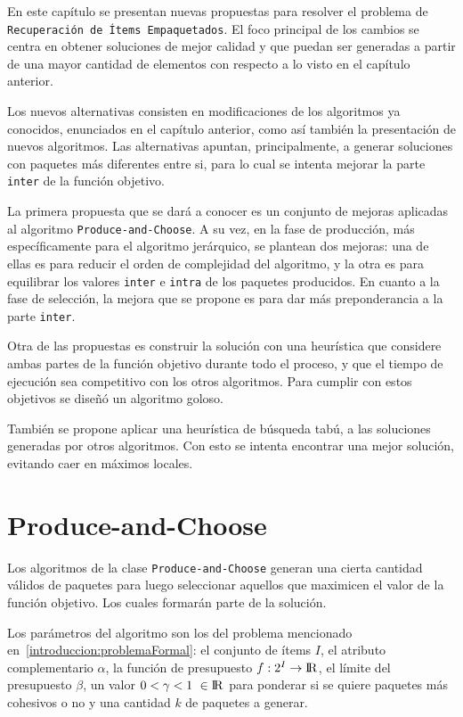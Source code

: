 En este capítulo se presentan nuevas propuestas para resolver el problema de \texttt{\\Recuperación de Ítems Empaquetados}. El foco principal de los cambios se centra en obtener soluciones de mejor calidad y que puedan ser generadas a partir de una mayor cantidad de elementos con respecto a lo visto en el capítulo anterior. 

Los nuevos alternativas consisten en modificaciones de los algoritmos ya conocidos, enunciados en el capítulo anterior, como así también la presentación de nuevos algoritmos. Las alternativas apuntan, principalmente, a generar soluciones con paquetes más diferentes entre si, para lo cual se intenta mejorar la parte \texttt{inter} de la función objetivo.

La primera propuesta que se dará a conocer es un conjunto de mejoras aplicadas al algoritmo \texttt{Produce\allowbreak-and\allowbreak-Choose}. A su vez, en la fase de producción, más específicamente para el algoritmo jerárquico, se plantean dos mejoras: una de ellas es para reducir el orden de complejidad del algoritmo, y la otra es para equilibrar los valores \texttt{inter} e \texttt{intra} de los paquetes producidos. En cuanto a la fase de selección, la mejora que se propone es para dar más preponderancia a la parte \texttt{inter}.

Otra de las propuestas es construir la solución con una heurística que considere ambas partes de la función objetivo durante todo el proceso, y que el tiempo de ejecución sea competitivo con los otros algoritmos. Para cumplir con estos objetivos se diseñó un algoritmo goloso.

También se propone aplicar una heurística de búsqueda tabú, a las soluciones generadas por otros algoritmos. Con esto se intenta encontrar una mejor solución, evitando caer en máximos locales. 

\section{Produce-and-Choose}
Los algoritmos de la clase \texttt{Produce\allowbreak-and\allowbreak-Choose} generan una cierta cantidad válidos de paquetes para luego seleccionar aquellos que maximicen el valor de la función objetivo. Los cuales formarán parte de la solución.

Los parámetros del algoritmo son los del problema mencionado en~\autoref{introduccion:problemaFormal}: el conjunto de ítems $I$, el atributo complementario $\alpha$, la función de presupuesto $f: 2^{I} \rightarrow \rm I \!R$, el límite del presupuesto $\beta$, un valor $0 < \gamma < 1\ \in \rm I \!R$ para ponderar si se quiere paquetes más cohesivos o no y una cantidad $k$ de paquetes a generar. 

